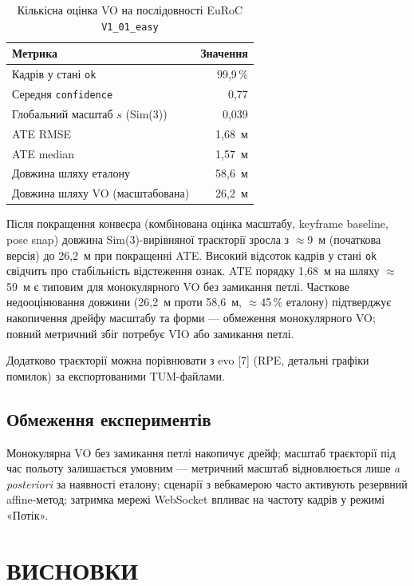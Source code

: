 \documentclass[14pt,a4paper,openany]{extreport}
\newcommand{\structpart}[1]{%
  \clearpage
  \chapter*{\bfseries\MakeUppercase{#1}}
  \addcontentsline{toc}{chapter}{#1}%
}
\begin{document}
\begin{table}[htbp]
  \caption{Кількісна оцінка VO на послідовності EuRoC \texttt{V1\_01\_easy}}
  \label{tab:vo-eval}
  \centering
  \begin{tabular}{|l|r|}
    \hline
    Метрика & Значення \\
    \hline
    Кадрів у стані \texttt{ok} & 99,9\,\% \\
    \hline
    Середня \texttt{confidence} & 0,77 \\
    \hline
    Глобальний масштаб $s$ (Sim(3)) & 0,039 \\
    \hline
    ATE RMSE & 1,68~м \\
    \hline
    ATE median & 1,57~м \\
    \hline
    Довжина шляху еталону & 58,6~м \\
    \hline
    Довжина шляху VO (масштабована) & 26,2~м \\
    \hline
  \end{tabular}
\end{table}

Після покращення конвеєра (комбінована оцінка масштабу, keyframe baseline, pose snap) довжина Sim(3)-вирівняної траєкторії зросла з $\approx$9~м (початкова версія) до 26,2~м при покращенні ATE. Високий відсоток кадрів у стані \texttt{ok} свідчить про стабільність відстеження ознак. ATE порядку 1,68~м на шляху $\approx$59~м є типовим для монокулярного VO без замикання петлі. Часткове недооцінювання довжини (26,2~м проти 58,6~м, $\approx$45\,\% еталону) підтверджує накопичення дрейфу масштабу та форми --- обмеження монокулярного VO; повний метричний збіг потребує VIO або замикання петлі.

Додатково траєкторії можна порівнювати з evo [7] (RPE, детальні графіки помилок) за експортованими TUM-файлами.

\section{Обмеження експериментів}

Монокулярна VO без замикання петлі накопичує дрейф; масштаб траєкторії під час польоту залишається умовним --- метричний масштаб відновлюється лише \emph{a posteriori} за наявності еталону; сценарії з вебкамерою часто активують резервний affine-метод; затримка мережі WebSocket впливає на частоту кадрів у режимі «Потік».

\structpart{Висновки}
\end{document}
